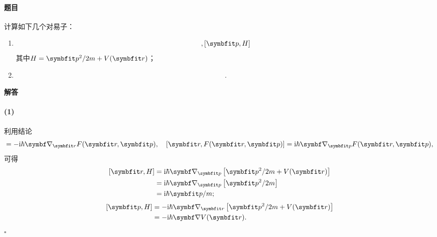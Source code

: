 \begin{tcolorbox}[breakable, title={\textbf{例题：两个对易子的计算}}]
    \paragraph{题目}
    计算如下几个对易子：
    \begin{enumerate}
        \item
            \begin{equation}
                [\rr,H], [\pp,H]
            \end{equation}
            其中$H=\pp^2/2m + V(\rr)$；
        \item
        \begin{equation}
                [p^2,\frac{1}{r}].
            \end{equation}
    \end{enumerate}

    \paragraph{解答}

    \paragraph{(1)}
    利用结论
    \begin{equation}
        [\pp,F(\rr,\pp)] = -\ii\hbar\del_{\rr}F(\rr,\pp),\quad [\rr,F(\rr,\pp)] = \ii\hbar\del_{\pp}F(\rr,\pp),
    \end{equation}
    可得
    \begin{equation}
    \begin{aligned}\relax
        [\rr, H]
        &= \ii\hbar\del_{\pp}\left[\pp^2/2m + V(\rr)\right] \\
        &= \ii\hbar\del_{\pp}\left[\pp^2/2m\right] \\
        &= \ii\hbar\pp/m;
    \end{aligned}
    \end{equation}
    \begin{equation}
    \begin{aligned}\relax
        [\pp, H]
        &= -\ii\hbar\del_{\rr}\left[\pp^2/2m + V(\rr)\right] \\
        &= -\ii\hbar\del V(\rr).
    \end{aligned}
    \end{equation}
    \hfill$\square$


\end{tcolorbox}
